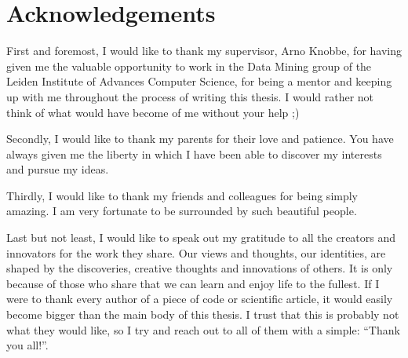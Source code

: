 \chapter*{Acknowledgements}
\noindent First and foremost, I would like to thank my supervisor, Arno Knobbe, for having given me the valuable opportunity to work in the Data Mining group of the Leiden Institute of Advances Computer Science, for being a mentor and keeping up with me throughout the process of writing this thesis.
I would rather not think of what would have become of me without your help ;)

Secondly, I would like to thank my parents for their love and patience.
You have always given me the liberty in which I have been able to discover my interests and pursue my ideas.

Thirdly, I would like to thank my friends and colleagues for being simply amazing.
I am very fortunate to be surrounded by such beautiful people.

Last but not least, I would like to speak out my gratitude to all the creators and innovators for the work they share.
Our views and thoughts, our identities, are shaped by the discoveries, creative thoughts and innovations of others.
It is only because of those who share that we can learn and enjoy life to the fullest.
If I were to thank every author of a piece of code or scientific article, it would easily become bigger than the main body of this thesis.
I trust that this is probably not what they would like, so I try and reach out to all of them with a simple: ``Thank you all!''.